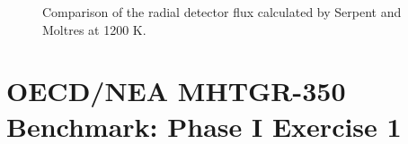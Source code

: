 \begin{figure}[htbp!]
	\centering
	\hfill
	\caption{Comparison of the radial detector flux calculated by Serpent and Moltres at 1200 K.}
	\label{fig:fullcore-1200-radial1}
\end{figure}


\section{OECD/NEA MHTGR-350 Benchmark: Phase I Exercise 1}
\label{sec:ph1e1}

